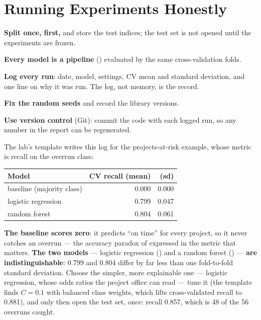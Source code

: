 \section{Running Experiments Honestly}

\begin{definitionbox}
\begin{tight}
  \item \textbf{Split once, first,} and store the test indices; the test set is not
        opened until the experiments are frozen.
  \item \textbf{Every model is a pipeline} () evaluated by the same
        cross-validation folds.
  \item \textbf{Log every run}: date, model, settings, CV mean and standard deviation,
        and one line on why it was run. The log, not memory, is the record.
  \item \textbf{Fix the random seeds} and record the library versions.
  \item \textbf{Use version control} (Git): commit the code with each logged run, so
        any number in the report can be regenerated.
\end{tight}
\end{definitionbox}

\begin{worked}
The lab's template writes this log for the projects-at-risk example, whose metric is
recall on the overrun class:

\smallskip
\begin{center}
\begin{tabular}{@{}lrr@{}}
\toprule
\textbf{Model} & \textbf{CV recall (mean)} & \textbf{(sd)} \\
\midrule
baseline (majority class) & 0.000 & 0.000 \\
logistic regression & 0.799 & 0.047 \\
random forest & 0.804 & 0.061 \\
\bottomrule
\end{tabular}
\end{center}

\smallskip
\textbf{The baseline scores zero}: it predicts ``on time'' for every project, so it
never catches an overrun --- the accuracy paradox of  expressed in the
metric that matters. \textbf{The two models} --- logistic regression ()
and a random forest () --- \textbf{are indistinguishable}: 0.799 and
0.804 differ by far less than one fold-to-fold standard deviation. Choose the simpler,
more explainable one --- logistic regression, whose odds ratios the project office can
read --- tune it (the template finds $C = 0.1$ with balanced class weights, which lifts
cross-validated recall to 0.881), and only then open the test set, once: recall 0.857,
which is 48 of the 56 overruns caught.
\end{worked}

